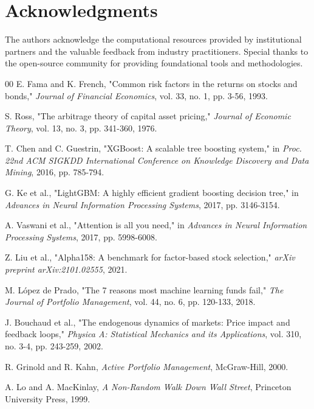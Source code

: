 \documentclass[conference]{IEEEtran}
\begin{document}
\section*{Acknowledgments}

The authors acknowledge the computational resources provided by institutional partners and the valuable feedback from industry practitioners. Special thanks to the open-source community for providing foundational tools and methodologies.

\begin{thebibliography}{00}
 E. Fama and K. French, "Common risk factors in the returns on stocks and bonds," \textit{Journal of Financial Economics}, vol. 33, no. 1, pp. 3-56, 1993.

 S. Ross, "The arbitrage theory of capital asset pricing," \textit{Journal of Economic Theory}, vol. 13, no. 3, pp. 341-360, 1976.

 T. Chen and C. Guestrin, "XGBoost: A scalable tree boosting system," in \textit{Proc. 22nd ACM SIGKDD International Conference on Knowledge Discovery and Data Mining}, 2016, pp. 785-794.

 G. Ke et al., "LightGBM: A highly efficient gradient boosting decision tree," in \textit{Advances in Neural Information Processing Systems}, 2017, pp. 3146-3154.

 A. Vaswani et al., "Attention is all you need," in \textit{Advances in Neural Information Processing Systems}, 2017, pp. 5998-6008.

 Z. Liu et al., "Alpha158: A benchmark for factor-based stock selection," \textit{arXiv preprint arXiv:2101.02555}, 2021.

 M. López de Prado, "The 7 reasons most machine learning funds fail," \textit{The Journal of Portfolio Management}, vol. 44, no. 6, pp. 120-133, 2018.

 J. Bouchaud et al., "The endogenous dynamics of markets: Price impact and feedback loops," \textit{Physica A: Statistical Mechanics and its Applications}, vol. 310, no. 3-4, pp. 243-259, 2002.

 R. Grinold and R. Kahn, \textit{Active Portfolio Management}, McGraw-Hill, 2000.

 A. Lo and A. MacKinlay, \textit{A Non-Random Walk Down Wall Street}, Princeton University Press, 1999.
\end{thebibliography}
\end{document}
